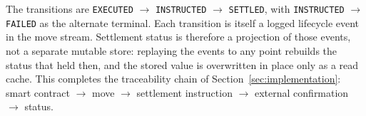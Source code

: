 \noindent The transitions are \texttt{EXECUTED} $\to$ \texttt{INSTRUCTED} $\to$ \texttt{SETTLED}, with \texttt{INSTRUCTED} $\to$ \texttt{FAILED} as the alternate terminal. Each transition is itself a logged lifecycle event in the move stream. Settlement status is therefore a projection of those events, not a separate mutable store: replaying the events to any point rebuilds the status that held then, and the stored value is overwritten in place only as a read cache. This completes the traceability chain of Section~\ref{sec:implementation}: smart contract $\to$ move $\to$ settlement instruction $\to$ external confirmation $\to$ status.

